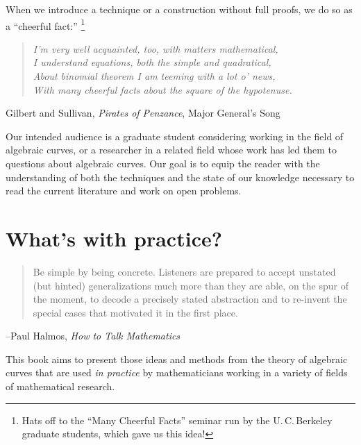 When we introduce a technique or a construction without full proofs,
we do so as a ``cheerful fact:''%
\footnote{Hats off to the ``Many Cheerful Facts'' seminar run
by the
U.\,C.\,Berkeley
graduate students, which gave us this idea!}

\begin{quote}\it{I'm very well acquainted, too, with matters mathematical,\\
I understand equations, both the simple and quadratical,\\
About binomial theorem I am teeming with a lot o' news,\\
With many cheerful facts about the square of the hypotenuse.}
%
%
\end{quote}
\emdash Gilbert and Sullivan, {\it Pirates of Penzance}, Major General's Song

Our intended audience is a graduate student considering working in the field of algebraic curves, or a researcher in a related field whose work has led them to questions about algebraic curves. Our goal is to equip the reader with the understanding of both the techniques and the state of our knowledge necessary to read the current literature and work on open problems.

\section*{What's with practice?}

\begin{quote}
Be simple by being concrete. Listeners are prepared to
accept unstated (but hinted) generalizations much more than they are able, on the spur of the moment, to
decode a precisely stated abstraction and to re-invent the special cases that motivated it in the first place. 
\end{quote}

--Paul Halmos, {\it How to Talk Mathematics}
%

This book aims to present those ideas and methods from the theory of
algebraic curves that are used \emph{in practice} by mathematicians
working in a variety of fields of mathematical research.

